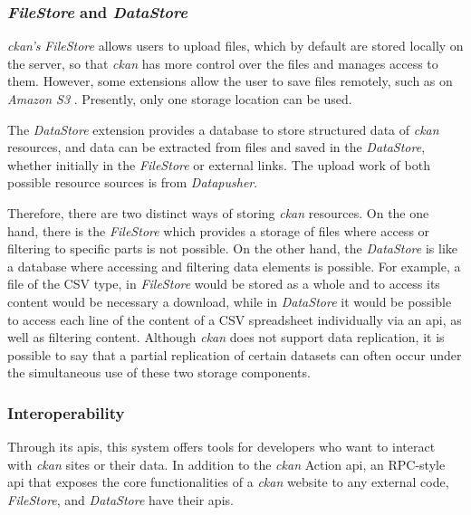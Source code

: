 \subsubsection{\textit{FileStore} and \textit{DataStore}}

\textit{\gls{ckan}'s} \textit{FileStore} allows users to upload files, which by default are stored locally on the server, so that \textit{\gls{ckan}} has more control over the files and manages access to them. However, some extensions allow the user to save files remotely, such as on \textit{Amazon S3} \citep{5}. Presently, only one storage location can be used.
  
The \textit{DataStore} extension provides a database to store structured data of \textit{\gls{ckan}} resources, and data can be extracted from files and saved in the \textit{DataStore}, whether initially in the \textit{FileStore} or external links. The upload work of both possible resource sources is from \textit{Datapusher}.
  
Therefore, there are two distinct ways of storing \textit{\gls{ckan}} resources. On the one hand, there is the \textit{FileStore} which provides a storage of files where access or filtering to specific parts is not possible. On the other hand, the \textit{DataStore} is like a database where accessing and filtering data elements is possible. For example, a file of the CSV type, in \textit{FileStore} would be stored as a whole and to access its content would be necessary a download, while in \textit{DataStore} it would be possible to access each line of the content of a CSV spreadsheet individually via an \gls{api}, as well as filtering content. Although \textit{\gls{ckan}} does not support data replication, it is possible to say that a partial replication of certain datasets can often occur under the simultaneous use of these two storage components.
  
\subsubsection{Interoperability}
  
Through its \gls{api}s, this system offers tools for developers who want to interact with \textit{\gls{ckan}} sites or their data. In addition to the \textit{\gls{ckan}} Action \gls{api}, an RPC-style \gls{api} that exposes the core functionalities of a \textit{\gls{ckan}} website to any external code, \textit{FileStore}, and \textit{DataStore} have their \gls{api}s. 
  
